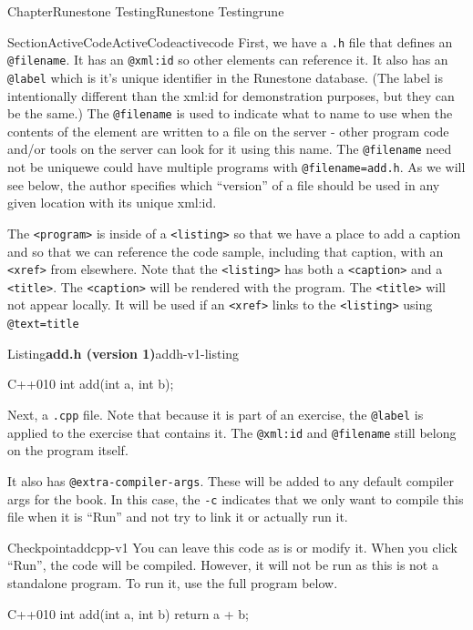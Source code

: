 \documentclass[oneside,10pt,]{book}
\newcommand{\mono}[1]{\texttt{#1}}
\numberwithin{equation}{section}
\begin{document}
\begin{chapterptx}{Chapter}{Runestone Testing}{}{Runestone Testing}{}{}{rune}
\begin{sectionptx}{Section}{ActiveCode}{}{ActiveCode}{}{}{activecode}
First, we have a \mono{.h} file that defines an \mono{@filename}. It has an \mono{@xml:id} so other elements can reference it. It also has an \mono{@label} which is it's unique identifier in the Runestone database. (The label is intentionally different than the xml:id for demonstration purposes, but they can be the same.) The \mono{@filename} is used to indicate what to name to use when the contents of the element are written to a file on the server - other program code and\slash{}or tools on the server can look for it using this name. The \mono{@filename} need not be unique\textemdash{}we could have multiple programs with \mono{@filename=\textquotedbl{}add.h\textquotedbl{}}. As we will see below, the author specifies which ``version'' of a file should be used in any given location with its unique xml:id.%
\par
The \mono{<program>} is inside of a \mono{<listing>} so that we have a place to add a caption and so that we can reference the code sample, including that caption, with an \mono{<xref>} from elsewhere. Note that the \mono{<listing>} has both a \mono{<caption>} and a \mono{<title>}. The \mono{<caption>} will be rendered with the program. The \mono{<title>} will not appear locally. It will be used if an \mono{<xref>} links to the \mono{<listing>} using \mono{@text=\textquotedbl{}title\textquotedbl{}}%
\begin{listingptx}{Listing}{\textbf{add.h (version 1)}}{addh-v1-listing}{}%
\begin{program}{C++}{0}{1}{0}
int add(int a, int b);
\end{program}
\end{listingptx}%
Next, a \mono{.cpp} file. Note that because it is part of an exercise, the \mono{@label} is applied to the exercise that contains it. The \mono{@xml:id} and \mono{@filename} still belong on the program itself.%
\par
It also has \mono{@extra-compiler-args}. These will be added to any default compiler args for the book. In this case, the \mono{-c} indicates that we only want to compile this file when it is ``Run'' and not try to link it or actually run it.%
\begin{inlineexercise}{Checkpoint}{}{addcpp-v1}%
You can leave this code as is or modify it. When you click ``Run'', the code will be compiled. However, it will not be run as this is not a standalone program. To run it, use the full program below.%
\begin{program}{C++}{0}{1}{0}
int add(int a, int b) {
    return a + b;
}
\end{program}

\end{inlineexercise}
\end{sectionptx}
\end{chapterptx}
\end{document}
